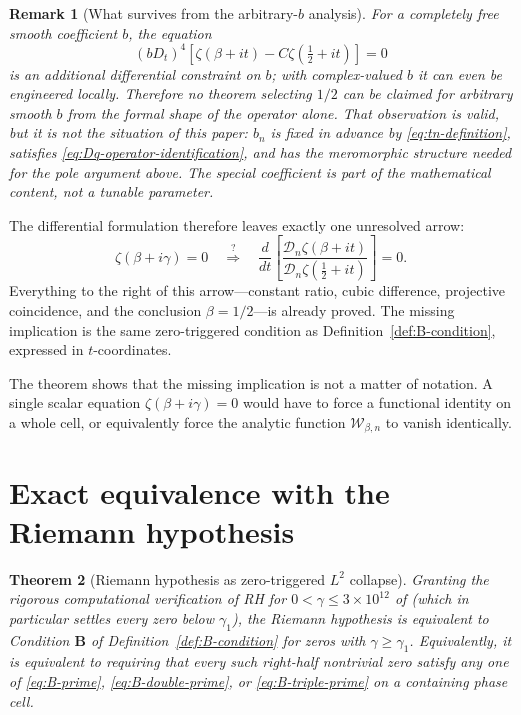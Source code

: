 \documentclass[11pt]{amsart}
\numberwithin{equation}{section}
\newtheorem{theorem}{Theorem}[section]
\newtheorem{remark}[theorem]{Remark}
\begin{document}
\begin{remark}[What survives from the arbitrary-$b$ analysis]
\label{rem:arbitrary-b-contrast}
For a completely free smooth coefficient $b$, the equation
\begin{equation}
 (bD_t)^4\left[
 \zeta(\beta+it)-C\zeta(\tfrac12+it)
 \right]=0
 \label{eq:arbitrary-b-equation}
\end{equation}
is an additional differential constraint on $b$; with complex-valued $b$ it
can even be engineered locally.  Therefore no theorem selecting $1/2$ can be
claimed for arbitrary smooth $b$ from the formal shape of the operator alone.
That observation is valid, but it is not the situation of this paper:
$b_n$ is fixed in advance by \eqref{eq:tn-definition}, satisfies
\eqref{eq:Dq-operator-identification}, and has the meromorphic structure
needed for the pole argument above.  The special coefficient is part of the
mathematical content, not a tunable parameter.
\end{remark}

The differential formulation therefore leaves exactly one unresolved arrow:
\begin{equation}
 \boxed{
 \zeta(\beta+i\gamma)=0
 \quad\stackrel{?}{\Longrightarrow}\quad
 \frac{d}{dt}\left[
 \frac{\mathcal D_n\zeta(\beta+it)}
 {\mathcal D_n\zeta(\tfrac12+it)}
 \right]=0.
 }
 \label{eq:operator-missing-zero-trigger}
\end{equation}
Everything to the right of this arrow---constant ratio, cubic difference,
projective coincidence, and the conclusion $\beta=1/2$---is already proved.
The missing implication is the same zero-triggered condition as
Definition~\ref{def:B-condition}, expressed in $t$-coordinates.

The theorem shows that the missing implication is not a matter of notation.
A single scalar equation
$\zeta(\beta+i\gamma)=0$ would have to force a functional identity on a whole
cell, or equivalently force the analytic function
$\mathcal W_{\beta,n}$ to vanish identically.

\section{Exact equivalence with the Riemann hypothesis}
\label{sec:rh-equivalence}

\begin{theorem}[Riemann hypothesis as zero-triggered $L^2$ collapse]
\label{thm:RH-equivalence}
Granting the rigorous computational verification of RH for
$0<\gamma\leq3\times10^{12}$ of \cite{PlattTrudgian2021} (which in
particular settles every zero below $\gamma_1$), the Riemann hypothesis is
equivalent to Condition $\mathbf B$ of Definition~\ref{def:B-condition} for
zeros with $\gamma\geq\gamma_1$.  Equivalently, it is equivalent to requiring
that every such right-half nontrivial zero satisfy any one of
\eqref{eq:B-prime}, \eqref{eq:B-double-prime}, or
\eqref{eq:B-triple-prime} on a containing phase cell.
\end{theorem}
\end{document}
